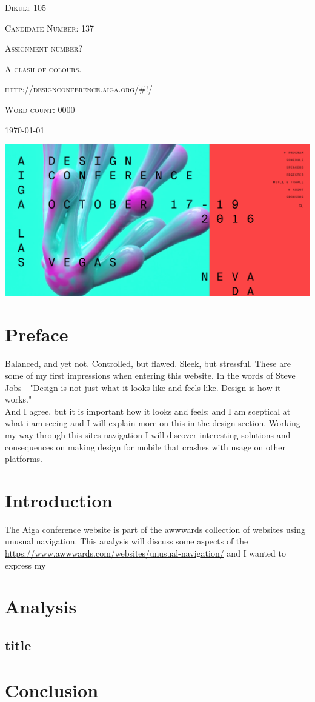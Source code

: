 \documentclass{article}
\begin{document}
	\begin{titlepage} 
		\centering
		{\scshape\Large Dikult 105\par}
		\vspace{2em}
		{\scshape\large Candidate Number: 137\par}
		\vspace{6em}
		{\scshape\Large Assignment number?\par}
		{\scshape\LARGE A clash of colours.\par}
		\vspace{1em}
		{\scshape\url{http://designconference.aiga.org/#!/}\par}
		\vfill
		{\scshape Word count: 0000\par}
		\vspace{3em}
		\large\today
	\end{titlepage}
	{\centering
        \includegraphics[width=\textwidth,height=\textheight,keepaspectratio]{frontpage}
    }
    \vspace{5em}
	\section{Preface}
        Balanced, and yet not. Controlled, but flawed. Sleek, but stressful. These are some of my first impressions when entering this website. In the words of Steve Jobs - "Design is not just what it looks like and feels like. Design is how it works."\\ And I agree, but it is important how it looks and feels; and I am sceptical at what i am seeing and I will explain more on this in the design-section. Working my way through this sites navigation I will discover interesting solutions and consequences on making design for mobile that crashes with usage on other platforms.
    \section{Introduction}
        The Aiga conference website is part of the awwwards collection of websites using unusual navigation. This analysis will discuss some aspects of the  \url{https://www.awwwards.com/websites/unusual-navigation/} and I wanted to express my 
    \section{Analysis}
        \subsection{title}
    \section{Conclusion}
    
\end{document}
